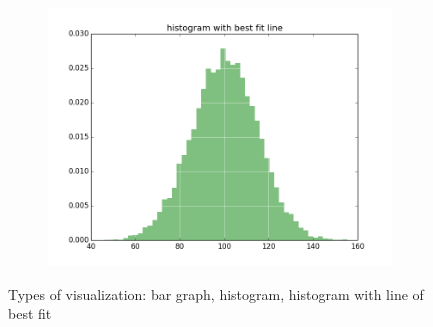 \begin{figure}
\begin{subfigure}{.3\textwidth}
\includegraphics[width=\textwidth]{histogram_fancy.png}
\end{subfigure}
\caption{Types of visualization: bar graph, histogram, histogram with line of best fit}
\label{fig:visTypes2}
\end{figure}
